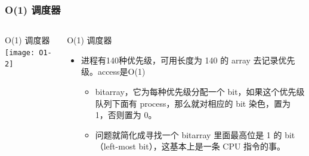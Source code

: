 \begin{frame}
	\frametitle{ O(1) 调度器}
	\begin{columns}
		\begin{column}{.4\textwidth}
			\Large \centering
			O(1) 调度器
			\texttt{[image: O1-2]}
			
		\end{column}
		
		\begin{column}{.6\textwidth}
			O(1) 调度器\\
			
			\begin{itemize}
				\item 进程有140种优先级，可用长度为 140 的 array 去记录优先级。access是O(1)
				
					\begin{itemize}
					\item bitarray，它为每种优先级分配一个 bit，如果这个优先级队列下面有 process，那么就对相应的 bit 染色，置为 1，否则置为 0。
					
					\item 问题就简化成寻找一个 bitarray 里面最高位是 1 的 bit（left-most bit），这基本上是一条 CPU 指令的事。
					\end{itemize}
				
			\end{itemize}
		\end{column}
	\end{columns}
\end{frame}

